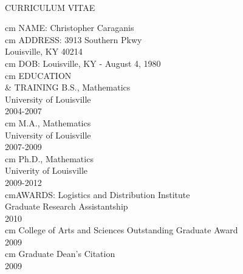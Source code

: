 \pagebreak
~\vspace{0.5 in}
\begin{center}

CURRICULUM VITAE

\end{center}

 cm
\noindent NAME: \tabto{3.5 cm} Christopher Caraganis\\ cm
\noindent ADDRESS: \tabto{3.5 cm} 3913 Southern Pkwy\\
\tabto{3.5 cm} Louisville, KY  40214\\
 cm
\noindent DOB: \tabto{3.5 cm} Louisville, KY - August 4, 1980\\

 cm \noindent EDUCATION\\
\& TRAINING \tabto{4.5 cm} B.S., Mathematics\\
\tabto{4.5 cm} University of Louisville\\
\tabto{4.5 cm} 2004-2007\\
 cm
\tabto{4.5 cm} M.A., Mathematics\\
\tabto{4.5 cm} University of Louisville\\
\tabto{4.5 cm} 2007-2009\\
 cm\tabto{4.5 cm} Ph.D., Mathematics\\
\tabto{4.5 cm} Univerity of Louisville\\
\tabto{4.5 cm} 2009-2012\\
 cm\noindent AWARDS: \tabto{3.5 cm} Logistics and Distribution Institute\\
\tabto{3.5 cm} Graduate Research Assistantship\\
\tabto{3.5 cm} 2010\\
 cm
\tabto{3.5 cm} College of Arts and Sciences Outstanding Graduate Award\\
\tabto{3.5 cm} 2009\\
 cm
\tabto{3.5 cm} Graduate Dean's Citation\\
\tabto{3.5 cm} 2009\\
